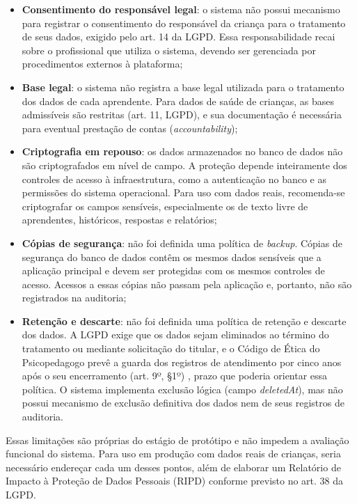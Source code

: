 \begin{itemize}
    \item \textbf{Consentimento do responsável legal}: o sistema não possui mecanismo para registrar o consentimento do responsável da criança para o tratamento de seus dados, exigido pelo art. 14 da LGPD. Essa responsabilidade recai sobre o profissional que utiliza o sistema, devendo ser gerenciada por procedimentos externos à plataforma;
    \item \textbf{Base legal}: o sistema não registra a base legal utilizada para o tratamento dos dados de cada aprendente. Para dados de saúde de crianças, as bases admissíveis são restritas (art. 11, LGPD), e sua documentação é necessária para eventual prestação de contas (\textit{accountability});
    \item \textbf{Criptografia em repouso}: os dados armazenados no banco de dados não são criptografados em nível de campo. A proteção depende inteiramente dos controles de acesso à infraestrutura, como a autenticação no banco e as permissões do sistema operacional. Para uso com dados reais, recomenda-se criptografar os campos sensíveis, especialmente os de texto livre de aprendentes, históricos, respostas e relatórios;
    \item \textbf{Cópias de segurança}: não foi definida uma política de \textit{backup}. Cópias de segurança do banco de dados contêm os mesmos dados sensíveis que a aplicação principal e devem ser protegidas com os mesmos controles de acesso. Acessos a essas cópias não passam pela aplicação e, portanto, não são registrados na auditoria;
    \item \textbf{Retenção e descarte}: não foi definida uma política de retenção e descarte dos dados. A LGPD exige que os dados sejam eliminados ao término do tratamento ou mediante solicitação do titular, e o Código de Ética do Psicopedagogo prevê a guarda dos registros de atendimento por cinco anos após o seu encerramento (art. 9º, §1º) \cite{abpp2019_codigo_etica}, prazo que poderia orientar essa política. O sistema implementa exclusão lógica (campo \textit{deletedAt}), mas não possui mecanismo de exclusão definitiva dos dados nem de seus registros de auditoria.
\end{itemize}

Essas limitações são próprias do estágio de protótipo e não impedem a avaliação funcional do sistema. Para uso em produção com dados reais de crianças, seria necessário endereçar cada um desses pontos, além de elaborar um Relatório de Impacto à Proteção de Dados Pessoais (RIPD) conforme previsto no art. 38 da LGPD.


